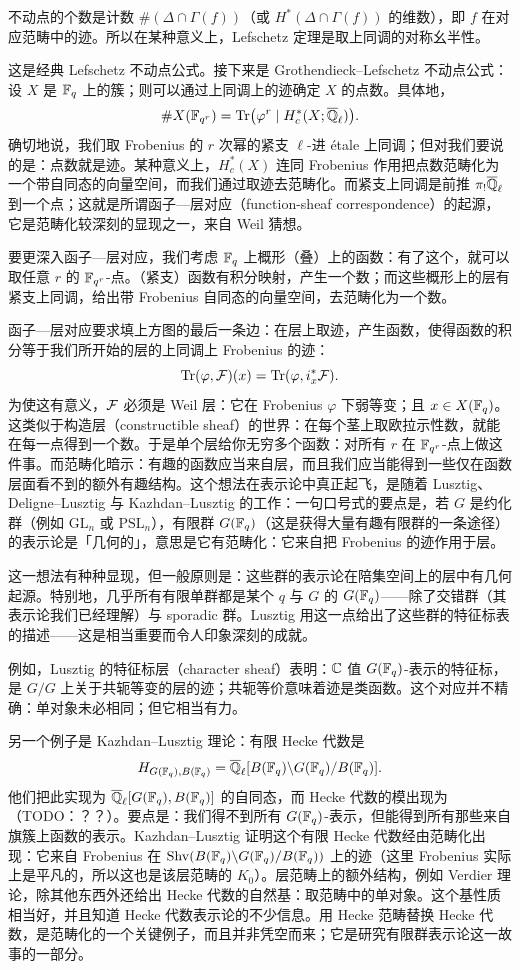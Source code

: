 不动点的个数是计数 $\#(\Delta\cap\Gamma(f))$（或 $H^*(\Delta\cap\Gamma(f))$ 的维数），即 $f$ 在对应范畴中的迹。所以在某种意义上，Lefschetz 定理是取上同调的对称幺半性。

这是经典 Lefschetz 不动点公式。接下来是 Grothendieck–Lefschetz 不动点公式：设 $X$ 是 $\mathbb{F}_q$ 上的簇；则可以通过上同调上的迹确定 $X$ 的点数。具体地，
\[
\#X(\mathbb{F}_{q^r})=\operatorname{Tr}\bigl(\varphi^r\mid H^*_c(X;\overline{\mathbb{Q}}_\ell)\bigr).
\]
确切地说，我们取 Frobenius 的 $r$ 次幂的紧支 $\ell$-进 étale 上同调；但对我们要说的是：点数就是迹。某种意义上，$H^*_c(X)$ 连同 Frobenius 作用把点数范畴化为一个带自同态的向量空间，而我们通过取迹去范畴化。而紧支上同调是前推 $\pi_!\overline{\mathbb{Q}}_\ell$ 到一个点；这就是所谓函子—层对应（function-sheaf correspondence）的起源，它是范畴化较深刻的显现之一，来自 Weil 猜想。

要更深入函子—层对应，我们考虑 $\mathbb{F}_q$ 上概形（叠）上的函数：有了这个，就可以取任意 $r$ 的 $\mathbb{F}_{q^r}$-点。（紧支）函数有积分映射，产生一个数；而这些概形上的层有紧支上同调，给出带 Frobenius 自同态的向量空间，去范畴化为一个数。

函子—层对应要求填上方图的最后一条边：在层上取迹，产生函数，使得函数的积分等于我们所开始的层的上同调上 Frobenius 的迹：
\[
\operatorname{Tr}(\varphi,\mathcal{F})(x)=\operatorname{Tr}(\varphi,i_x^*\mathcal{F}).
\]
为使这有意义，$\mathcal{F}$ 必须是 Weil 层：它在 Frobenius $\varphi$ 下弱等变；且 $x\in X(\mathbb{F}_q)$。这类似于构造层（constructible sheaf）的世界：在每个茎上取欧拉示性数，就能在每一点得到一个数。于是单个层给你无穷多个函数：对所有 $r$ 在 $\mathbb{F}_{q^r}$-点上做这件事。而范畴化暗示：有趣的函数应当来自层，而且我们应当能得到一些仅在函数层面看不到的额外有趣结构。这个想法在表示论中真正起飞，是随着 Lusztig、Deligne–Lusztig 与 Kazhdan–Lusztig 的工作：一句口号式的要点是，若 $G$ 是约化群（例如 $\mathrm{GL}_n$ 或 $\mathrm{PSL}_n$），有限群 $G(\mathbb{F}_q)$（这是获得大量有趣有限群的一条途径）的表示论是「几何的」，意思是它有范畴化：它来自把 Frobenius 的迹作用于层。


这一想法有种种显现，但一般原则是：这些群的表示论在陪集空间上的层中有几何起源。特别地，几乎所有有限单群都是某个 $q$ 与 $G$ 的 $G(\mathbb{F}_q)$——除了交错群（其表示论我们已经理解）与 sporadic 群。Lusztig 用这一点给出了这些群的特征标表的描述——这是相当重要而令人印象深刻的成就。

例如，Lusztig 的特征标层（character sheaf）表明：$\mathbb{C}$ 值 $G(\mathbb{F}_q)$-表示的特征标，是 $G/G$ 上关于共轭等变的层的迹；共轭等价意味着迹是类函数。这个对应并不精确：单对象未必相同；但它相当有力。

另一个例子是 Kazhdan–Lusztig 理论：有限 Hecke 代数是
\[
H_{G(\mathbb{F}_q),B(\mathbb{F}_q)}=\overline{\mathbb{Q}}_\ell[B(\mathbb{F}_q)\backslash G(\mathbb{F}_q)/B(\mathbb{F}_q)].
\]
他们把此实现为 $\overline{\mathbb{Q}}_\ell[G(\mathbb{F}_q),B(\mathbb{F}_q)]$ 的自同态，而 Hecke 代数的模出现为（TODO：？？）。要点是：我们得不到所有 $G(\mathbb{F}_q)$-表示，但能得到所有那些来自旗簇上函数的表示。Kazhdan–Lusztig 证明这个有限 Hecke 代数经由范畴化出现：它来自 Frobenius 在 $\mathrm{Shv}(B(\mathbb{F}_q)\backslash G(\mathbb{F}_q)/B(\mathbb{F}_q))$ 上的迹（这里 Frobenius 实际上是平凡的，所以这也是该层范畴的 $K_0$）。层范畴上的额外结构，例如 Verdier 理论，除其他东西外还给出 Hecke 代数的自然基：取范畴中的单对象。这个基性质相当好，并且知道 Hecke 代数表示论的不少信息。用 Hecke 范畴替换 Hecke 代数，是范畴化的一个关键例子，而且并非凭空而来；它是研究有限群表示论这一故事的一部分。

